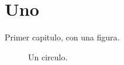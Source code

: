 \chapter{Uno}\label{cap:uno}

Primer capitulo, con una figura.

\begin{figure}[ht]
  \centering
  \caption{Un circulo.}
\end{figure}
